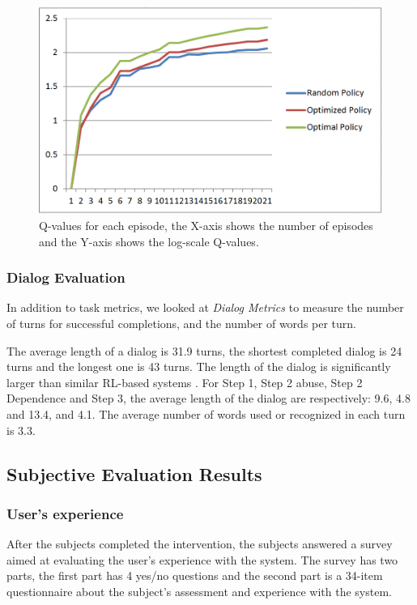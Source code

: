 \begin{sloppy}
 \begin{figure}
 \centering
 \includegraphics[width=\columnwidth]{img/q-values.png}
 \caption{Q-values for each episode, the X-axis shows the number of episodes and the Y-axis shows the log-scale Q-values.}
 \label{q-values}
 \end{figure}

\subsubsection{Dialog Evaluation} 
In addition to {task metrics}, we looked at {\em Dialog Metrics} to measure the number of turns for successful completions, and the number of words per turn.  

The average length of a dialog is 31.9 turns, the shortest completed dialog is 24 turns and the longest one is 43 turns. The length of the dialog is significantly larger than similar RL-based systems \cite{NjFunSingh02,young2010POMDP,frampton2009}. For Step 1, Step 2 abuse, Step 2 Dependence and Step 3, the average length of the dialog are respectively: 9.6, 4.8 and 13.4, and 4.1.
The average number of words used or recognized in each turn is 3.3. 

\subsection{Subjective Evaluation Results}

\subsubsection{User's experience}
After the subjects completed the intervention, the subjects answered a survey aimed at evaluating the user's experience with the system. The survey has two parts, the first part has 4 yes/no questions and the second part is a 34-item questionnaire about the subject's assessment and experience with the system. 


\end{sloppy}
